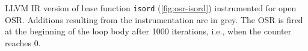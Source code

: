 \label{fig:osr-isordfrom} LLVM IR version of base function {\tt isord} (\myfigure\ref{fig:osr-isord}) instrumented for open OSR. Additions resulting from the instrumentation are in grey. The OSR is fired at the beginning of the loop body after 1000 iterations, i.e., when the counter reaches 0.


